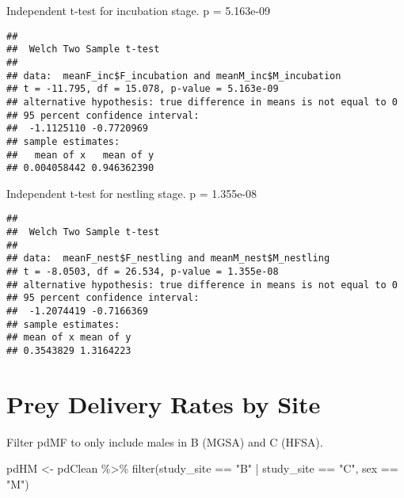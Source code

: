 \documentclass[
]{article}
\newenvironment{Shaded}{\begin{snugshade}}{\end{snugshade}}
\newcommand{\FunctionTok}[1]{\textcolor[rgb]{0.00,0.00,0.00}{#1}}
\newcommand{\NormalTok}[1]{#1}
\newcommand{\OtherTok}[1]{\textcolor[rgb]{0.56,0.35,0.01}{#1}}
\newcommand{\SpecialCharTok}[1]{\textcolor[rgb]{0.00,0.00,0.00}{#1}}
\newcommand{\StringTok}[1]{\textcolor[rgb]{0.31,0.60,0.02}{#1}}
\begin{document}
Independent t-test for incubation stage. p = 5.163e-09

\begin{Shaded}
\end{Shaded}

\begin{verbatim}
## 
##  Welch Two Sample t-test
## 
## data:  meanF_inc$F_incubation and meanM_inc$M_incubation
## t = -11.795, df = 15.078, p-value = 5.163e-09
## alternative hypothesis: true difference in means is not equal to 0
## 95 percent confidence interval:
##  -1.1125110 -0.7720969
## sample estimates:
##   mean of x   mean of y 
## 0.004058442 0.946362390
\end{verbatim}

Independent t-test for nestling stage. p = 1.355e-08

\begin{Shaded}
\end{Shaded}

\begin{verbatim}
## 
##  Welch Two Sample t-test
## 
## data:  meanF_nest$F_nestling and meanM_nest$M_nestling
## t = -8.0503, df = 26.534, p-value = 1.355e-08
## alternative hypothesis: true difference in means is not equal to 0
## 95 percent confidence interval:
##  -1.2074419 -0.7166369
## sample estimates:
## mean of x mean of y 
## 0.3543829 1.3164223
\end{verbatim}

\hypertarget{prey-delivery-rates-by-site}{%
\section{Prey Delivery Rates by
Site}\label{prey-delivery-rates-by-site}}

Filter pdMF to only include males in B (MGSA) and C (HFSA).

\begin{Shaded}
\begin{Highlighting}[]
\NormalTok{pdHM }\OtherTok{\textless{}{-}}\NormalTok{ pdClean }\SpecialCharTok{\%\textgreater{}\%}
  \FunctionTok{filter}\NormalTok{(study\_site }\SpecialCharTok{==} \StringTok{"B"} \SpecialCharTok{|}\NormalTok{ study\_site }\SpecialCharTok{==} \StringTok{"C"}\NormalTok{, sex }\SpecialCharTok{==} \StringTok{"M"}\NormalTok{)}
\end{Highlighting}
\end{Shaded}
\end{document}
